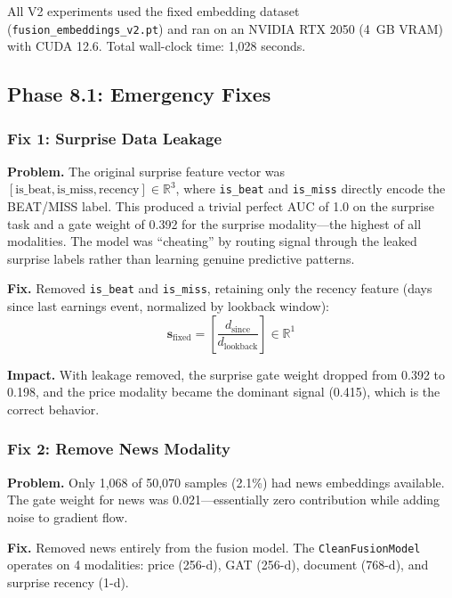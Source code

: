 \documentclass[12pt,a4paper]{article}
\begin{document}
All V2 experiments used the fixed embedding dataset (\texttt{fusion\_embeddings\_v2.pt}) and ran on an NVIDIA RTX 2050 (4~GB VRAM) with CUDA 12.6. Total wall-clock time: 1,028 seconds.

\subsection{Phase 8.1: Emergency Fixes}
\label{sec:v2phase1}

\subsubsection{Fix 1: Surprise Data Leakage}

\textbf{Problem.} The original surprise feature vector was $[\text{is\_beat}, \text{is\_miss}, \text{recency}] \in \mathbb{R}^3$, where \texttt{is\_beat} and \texttt{is\_miss} directly encode the BEAT/MISS label. This produced a trivial perfect AUC of 1.0 on the surprise task and a gate weight of 0.392 for the surprise modality---the highest of all modalities. The model was ``cheating'' by routing signal through the leaked surprise labels rather than learning genuine predictive patterns.

\textbf{Fix.} Removed \texttt{is\_beat} and \texttt{is\_miss}, retaining only the recency feature (days since last earnings event, normalized by lookback window):
\begin{equation}
\mathbf{s}_{\text{fixed}} = \left[\frac{d_{\text{since}}}{d_{\text{lookback}}}\right] \in \mathbb{R}^1
\end{equation}

\textbf{Impact.} With leakage removed, the surprise gate weight dropped from 0.392 to 0.198, and the price modality became the dominant signal (0.415), which is the correct behavior.

\subsubsection{Fix 2: Remove News Modality}

\textbf{Problem.} Only 1,068 of 50,070 samples (2.1\%) had news embeddings available. The gate weight for news was 0.021---essentially zero contribution while adding noise to gradient flow.

\textbf{Fix.} Removed news entirely from the fusion model. The \texttt{CleanFusionModel} operates on 4 modalities: price (256-d), GAT (256-d), document (768-d), and surprise recency (1-d).
\end{document}
